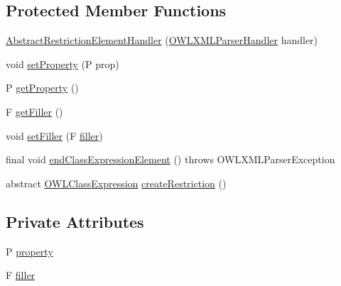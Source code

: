 \subsection*{Protected Member Functions}
\begin{DoxyCompactItemize}
\item 
\hyperlink{classorg_1_1coode_1_1owlapi_1_1owlxmlparser_1_1_abstract_restriction_element_handler_3_01_p_01ex1af432a427073023608ad4746636c054_add3e1ac743276f58067392af3e90510c}{Abstract\-Restriction\-Element\-Handler} (\hyperlink{classorg_1_1coode_1_1owlapi_1_1owlxmlparser_1_1_o_w_l_x_m_l_parser_handler}{O\-W\-L\-X\-M\-L\-Parser\-Handler} handler)
\item 
void \hyperlink{classorg_1_1coode_1_1owlapi_1_1owlxmlparser_1_1_abstract_restriction_element_handler_3_01_p_01ex1af432a427073023608ad4746636c054_a283081865a2356db64c6752666df6b93}{set\-Property} (P prop)
\item 
P \hyperlink{classorg_1_1coode_1_1owlapi_1_1owlxmlparser_1_1_abstract_restriction_element_handler_3_01_p_01ex1af432a427073023608ad4746636c054_a2f1209caa767131be7c4e89d3fe75976}{get\-Property} ()
\item 
F \hyperlink{classorg_1_1coode_1_1owlapi_1_1owlxmlparser_1_1_abstract_restriction_element_handler_3_01_p_01ex1af432a427073023608ad4746636c054_a2bf53deadf547e57b89c70217e9694f9}{get\-Filler} ()
\item 
void \hyperlink{classorg_1_1coode_1_1owlapi_1_1owlxmlparser_1_1_abstract_restriction_element_handler_3_01_p_01ex1af432a427073023608ad4746636c054_aba12f3a4e6538b63700fb0b95567e70d}{set\-Filler} (F \hyperlink{classorg_1_1coode_1_1owlapi_1_1owlxmlparser_1_1_abstract_restriction_element_handler_3_01_p_01ex1af432a427073023608ad4746636c054_a2eb1d4d2e567a5e696341c700bcb7f29}{filler})
\item 
final void \hyperlink{classorg_1_1coode_1_1owlapi_1_1owlxmlparser_1_1_abstract_restriction_element_handler_3_01_p_01ex1af432a427073023608ad4746636c054_ae26466d999d400cf13df2103cfc57f97}{end\-Class\-Expression\-Element} ()  throws O\-W\-L\-X\-M\-L\-Parser\-Exception 
\item 
abstract \hyperlink{interfaceorg_1_1semanticweb_1_1owlapi_1_1model_1_1_o_w_l_class_expression}{O\-W\-L\-Class\-Expression} \hyperlink{classorg_1_1coode_1_1owlapi_1_1owlxmlparser_1_1_abstract_restriction_element_handler_3_01_p_01ex1af432a427073023608ad4746636c054_aa8dada7d3673a09e3e1b3ff88b20942c}{create\-Restriction} ()
\end{DoxyCompactItemize}
\subsection*{Private Attributes}
\begin{DoxyCompactItemize}
\item 
P \hyperlink{classorg_1_1coode_1_1owlapi_1_1owlxmlparser_1_1_abstract_restriction_element_handler_3_01_p_01ex1af432a427073023608ad4746636c054_a308abdd6f61755ac895ff0fc41f4b08b}{property}
\item 
F \hyperlink{classorg_1_1coode_1_1owlapi_1_1owlxmlparser_1_1_abstract_restriction_element_handler_3_01_p_01ex1af432a427073023608ad4746636c054_a2eb1d4d2e567a5e696341c700bcb7f29}{filler}
\end{DoxyCompactItemize}
